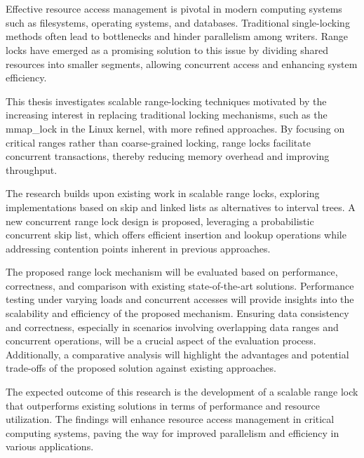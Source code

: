 \chapter{\abstractname}

Effective resource access management is pivotal in modern computing systems such as filesystems, operating systems, and databases. Traditional single-locking methods often lead to bottlenecks and hinder parallelism among writers. Range locks have emerged as a promising solution to this issue by dividing shared resources into smaller segments, allowing concurrent access and enhancing system efficiency.

This thesis investigates scalable range-locking techniques motivated by the increasing interest in replacing traditional locking mechanisms, such as the mmap\_lock in the Linux kernel, with more refined approaches. By focusing on critical ranges rather than coarse-grained locking, range locks facilitate concurrent transactions, thereby reducing memory overhead and improving throughput.

The research builds upon existing work in scalable range locks, exploring implementations based on skip and linked lists as alternatives to interval trees. A new concurrent range lock design is proposed, leveraging a probabilistic concurrent skip list, which offers efficient insertion and lookup operations while addressing contention points inherent in previous approaches.

The proposed range lock mechanism will be evaluated based on performance, correctness, and comparison with existing state-of-the-art solutions. Performance testing under varying loads and concurrent accesses will provide insights into the scalability and efficiency of the proposed mechanism. Ensuring data consistency and correctness, especially in scenarios involving overlapping data ranges and concurrent operations, will be a crucial aspect of the evaluation process. Additionally, a comparative analysis will highlight the advantages and potential trade-offs of the proposed solution against existing approaches.

The expected outcome of this research is the development of a scalable range lock that outperforms existing solutions in terms of performance and resource utilization. The findings will enhance resource access management in critical computing systems, paving the way for improved parallelism and efficiency in various applications.


